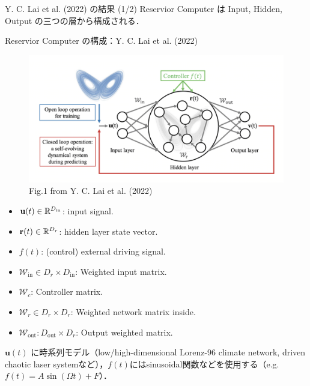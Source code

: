 \begin{frame}{Y. C. Lai et al. (2022) の結果 (1/2)}
    Reservior Computer は Input, Hidden, Output の三つの層から構成される．
    \begin{block}{Reservior Computer の構成：Y. C. Lai et al. (2022)}
    \vspace{0.1cm}
        \begin{minipage}{0.4\textwidth}
            \begin{figure}
                \includegraphics[width=\textwidth]{Fig/Fig.1_Lai.png}
                \caption*{Fig.1 from Y. C. Lai et al. (2022)}
                \label{Fig.1_Lai.png} %
            \end{figure}
        \end{minipage}%
        \begin{minipage}{0.6\textwidth}
            \begin{itemize}
                \item $\mathbf{u}(t) \in \mathbb{R}^{D_{\text{in}}}$: input signal. 
                \item $\mathbf{r}(t) \in \mathbb{R}^{D_r} $: hidden layer state vector.
                \item $f(t)$: (control) external driving signal.  
                \item $\mathcal{W}_{\text{in}} \in D_r \times D_{\text{in}}$: Weighted input matrix.  
                \item $\mathcal{W}_c$: Controller matrix.
                \item $ \mathcal{W}_r \in D_r \times D_{r}$: Weighted network matrix inside.
                \item $\mathcal{W}_{\text{out}}: D_{\text{out}} \times D_{r}$: Output weighted matrix.
            \end{itemize}
    \end{minipage}
    \end{block}
    $\mathbf{u}(t)$ に時系列モデル（low/high-dimensional Lorenz-96 climate network, driven chaotic laser systemなど），$f(t)$にはsinusoidal関数などを使用する（e.g. $f(t) = A \sin (\Omega t) + F$）．
\end{frame}


